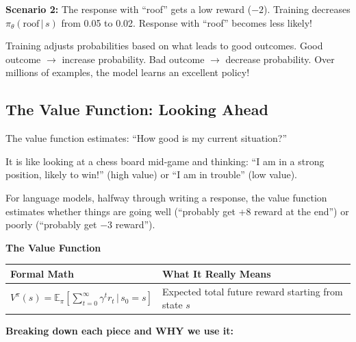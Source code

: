 \begin{chapterenv}
\textbf{Scenario 2:} The response with ``roof'' gets a low reward ($-2$). Training decreases $\pi_\theta(\text{roof} \,|\, s)$ from 0.05 to 0.02. Response with ``roof'' becomes less likely!

\begin{tipbox}
Training adjusts probabilities based on what leads to good outcomes. Good outcome $\rightarrow$ increase probability. Bad outcome $\rightarrow$ decrease probability. Over millions of examples, the model learns an excellent policy!
\end{tipbox}

\subsection{The Value Function: Looking Ahead}

The value function estimates: ``How good is my current situation?''

It is like looking at a chess board mid-game and thinking: ``I am in a strong position, likely to win!'' (high value) or ``I am in trouble'' (low value).

For language models, halfway through writing a response, the value function estimates whether things are going well (``probably get +8 reward at the end'') or poorly (``probably get $-3$ reward'').

\begin{infobox}
\textbf{The Value Function}

\begin{center}
\begin{tabular}{p{}p{}}
\toprule
\textbf{Formal Math} & \textbf{What It Really Means} \\
\midrule
$V^\pi(s) = \mathbb{E}_\pi\!\left[\sum_{t=0}^\infty \gamma^t r_t \,\Big|\, s_0 = s\right]$ & Expected total future reward starting from state $s$ \\
\bottomrule
\end{tabular}
\end{center}

\textbf{Breaking down each piece and WHY we use it:}


\end{infobox}
\end{chapterenv}
